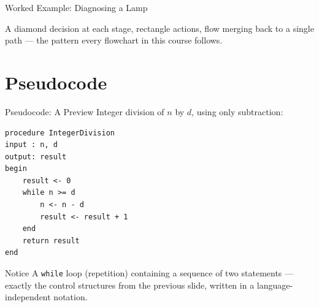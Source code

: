 \documentclass[9pt,aspectratio=169,xcolor=table]{beamer}
\begin{document}
\begin{frame}{Worked Example: Diagnosing a Lamp}
    \leavevmode
    \begin{center}
    \end{center}

    \vspace{2mm}
    {\small A diamond decision at each stage, rectangle actions, flow
    merging back to a single path --- the pattern every flowchart in
    this course follows.}
\end{frame}

\section{Pseudocode}

\begin{frame}[fragile]{Pseudocode: A Preview}
    \leavevmode
    Integer division of $n$ by $d$, using only subtraction:

\begin{lstlisting}[language={}]
procedure IntegerDivision
input : n, d
output: result
begin
    result <- 0
    while n >= d
        n <- n - d
        result <- result + 1
    end
    return result
end
\end{lstlisting}

    \vspace{2mm}
    \begin{block}{Notice}
        A \texttt{while} loop (repetition) containing a sequence of two
        statements --- exactly the control structures from the previous
        slide, written in a language-independent notation.
    \end{block}
\end{frame}
\end{document}
